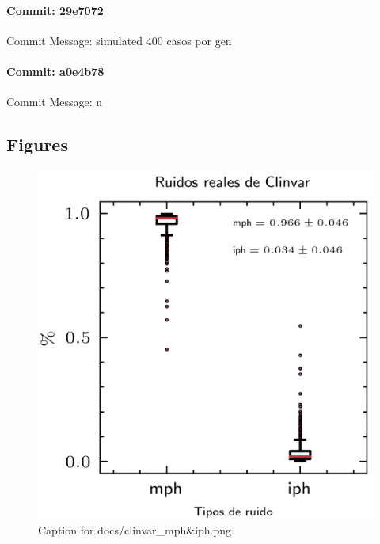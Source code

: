 \documentclass{article}
\begin{document}
\paragraph{Commit: 29e7072}
Commit Message: simulated 400 casos por gen

\paragraph{Commit: a0e4b78}
Commit Message: n

\subsection{Figures}
\begin{figure}[h] \centering \includegraphics{docs/clinvar_mph&iph.png} \caption{Caption for docs/clinvar_mph&iph.png.} \end{figure}
\end{document}

